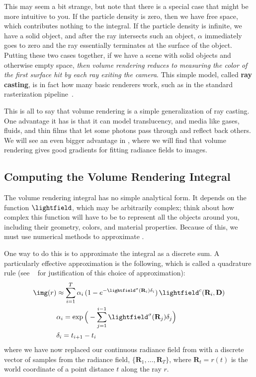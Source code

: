 This may seem a bit strange, but note that there is a special case that might be more intuitive to you. If the particle density is zero, then we have free space, 
which contributes nothing to the integral. If the particle density is infinite, we have a solid object, and after the ray intersects such an object, $\alpha$ 
immediately goes to zero and the ray essentially terminates at the surface of the object. Putting these two cases together, if we have a scene with solid objects 
and otherwise empty space, \textit{then volume rendering reduces to measuring the color of the first surface hit by each ray exiting the camera}. 
This simple model, called \textbf{ray casting}, is in fact how many basic renderers work, such as in the standard rasterization pipeline~\cite{shirley2009fundamentals}. 

This is all to say that volume rendering is a simple generalization of ray casting. One advantage it has is that it can model translucency, and media like gases, fluids, 
and thin films that let some photons pass through and reflect back others. We will see an even bigger advantage in \sect{\ref{sec:nerfs:fitting}}, where we will find that 
volume rendering gives good gradients for fitting radiance fields to images.

\subsection{Computing the Volume Rendering Integral}

The volume rendering integral has no simple analytical form. It depends on the function $\lightfield$, which may be arbitrarily complex; 
think about how complex this function will have to be to represent all the objects around you, including their geometry, colors, and material properties.
 Because of this, we must use numerical methods to approximate \eqn{\ref{eqn:nerfs:vol_rendering_integral}}.

One way to do this is to approximate the integral as a discrete sum. A particularly effective approximation is the following, 
which is called a quadrature rule (see ~\cite{max1995optical,max2005local} for justification of this choice of approximation):
\begin{align}
    \img(r) &\approx \sum_{i=1}^T \alpha_i \, (1-e^{-\lightfield^\sigma(\mathbf{R}_i)\delta_i}) \, \lightfield^c(\mathbf{R}_i, \mathbf{D})\\
    &\alpha_i = \exp\Big(-\sum_{j=1}^{i-1} \lightfield^\sigma(\mathbf{R}_j)\delta_j\Big)\\
    &\delta_i = t_{i+1} - t_i
\end{align}
where we have now replaced our continuous radiance field from \eqn{\ref{eqn:nerfs:vol_rendering_integral}} with a discrete vector of samples from the radiance field, 
$\{\mathbf{R}_1, \ldots, \mathbf{R}_T\}$, where $\mathbf{R}_t = r(t)$ is the world coordinate of a point distance $t$ along the ray $r$.


